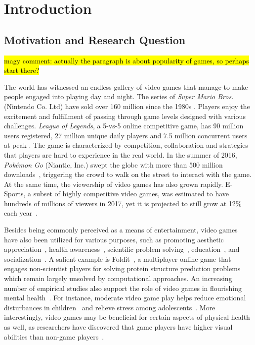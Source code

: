 
\chapter{Introduction} %

\label{chapter:intro} 

\section{Motivation and Research Question}\label{chap1:motiv}

\hl{magy comment: actually the paragraph is about popularity of games, so perhaps start there?}

The world has witnessed an endless gallery of video games that manage to make people engaged into playing day and night. The series of \textit{Super Mario Bros.} (Nintendo Co. Ltd) have sold over 160 million since the 1980s \cite{mariosale}. Players enjoy the excitement and fulfillment of passing through game levels designed with various challenges. \textit{League of Legends}, a 5-vs-5 online competitive game, has 90 million users registered, 27 million unique daily players and 7.5 million concurrent users at peak \cite{lol_fanbase,lol_27million}. The game is characterized by competition, collaboration and strategies that players are hard to experience in the real world. In the summer of 2016, \textit{Pok\'{e}mon Go} (Niantic, Inc.) swept the globe with more than 500 million downloads~\cite{pokemongo}, triggering the crowd to walk on the street to interact with the game. At the same time, the viewership of video games has also grown rapidly. E-Sports, a subset of highly competitive video games, was estimated to have hundreds of millions of viewers in 2017, yet it is projected to still grow at 12\% each year~\cite{superdata2017}. 

Besides being commonly perceived as a means of entertainment, video games have also been utilized for various purposes, such as promoting aesthetic appreciation~\cite{jarvinen2008understanding}, health awareness~\cite{shiyko2016effects}, scientific problem solving~\cite{cooper2010predicting}, education~\cite{gee2003video}, and socialization~\cite{ferguson2013friends}. A salient example is Foldit~\cite{cooper2010predicting}, a multiplayer online game that engages non-scientist players for solving protein structure prediction problems which remain largely unsolved by computational approaches. An increasing number of empirical studies also support the role of video games in flourishing mental health~\cite{jones2014gaming}. For instance, moderate video game play helps reduce emotional disturbances in children~\cite{hull2009computer} and relieve stress among adolescents~\cite{colwell2007needs}. More interestingly, video games may be beneficial for certain aspects of physical health as well, as researchers have discovered that game players have higher visual abilities than non-game players~\cite{green2003action,li2009enhancing}.

